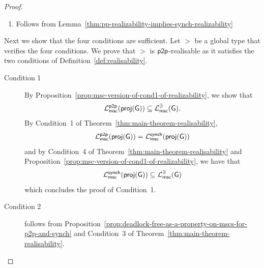 \begin{proof}
\begin{description}
\begin{enumerate}
        \item  Follows from Lemma~\ref{thm:pp-realizability-implies-synch-realizability} 
    \end{enumerate}
\item[$\Leftarrow$]    Next we  show that the four conditions are sufficient.
    Let $\gt$ be a global type that verifies the four conditions.
    We prove that $\gt$ is $\mathsf{p2p}$-realisable as it satisfies the two conditions of Definition~\ref{def:realisability}.
    \begin{description}
        \item[Condition 1]
          By Proposition~\ref{prop:msc-version-of-cond1-of-realizability},
          we show that 
          $$
          \mathcal{L}_{\mathsf{msc}}^{\mathsf{p2p}}(\mathsf{proj}(\mathsf{G})) \subseteq \mathcal{L}_{\mathsf{msc}}^{\exists}(\mathsf{G}).
          $$
          By Condition~1 of Theorem~\ref{thm:main-theorem-realisability},
          $$
            \mathcal{L}_{\mathsf{msc}}^{\mathsf{p2p}}(\mathsf{proj}(\mathsf{G})) = \mathcal{L}_{\mathsf{msc}}^{\mathsf{synch}}(\mathsf{proj}(\mathsf{G}))
          $$
          and by Condition~4 of Theorem~\ref{thm:main-theorem-realisability} and Proposition~\ref{prop:msc-version-of-cond1-of-realizability},
          we have that  
          $$
            \mathcal{L}_{\mathsf{msc}}^{\mathsf{synch}}(\mathsf{proj}(\mathsf{G})) \subseteq \mathcal{L}_{\mathsf{msc}}^{\exists}(\mathsf{G})
          $$
          which concludes the proof of Condition~1.
          \item[Condition 2]
        follows from Proposition~\ref{prop:deadlock-free-as-a-property-on-mscs-for-p2p-and-synch}
        and Condition~3 of Theorem~\ref{thm:main-theorem-realisability}.
    \end{description}
\end{description}
\end{proof}
